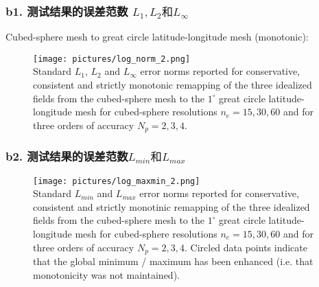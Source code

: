 \documentclass[unknownkeysallowed]{beamer}
\begin{document}
\begin{spacing}{1.2}
\begin{frame}
\frametitle{b1. 测试结果的误差范数 $L_1, L_2 \text{和}L_\infty$}
\scriptsize{Cubed-sphere mesh to great circle latitude-longitude mesh (\textcolor[rgb]{0,0,1}{monotonic}):}
\begin{figure}[c]
\texttt{[image: pictures/log\_norm\_2.png]}\\
\tiny{Standard $L_1$, $L_2$ and $L_{\infty}$ error norms reported for conservative, consistent and strictly monotonic remapping
of the three idealized fields from the cubed-sphere mesh to the $1^\circ$ great circle latitude-longitude
mesh for cubed-sphere resolutions $n_e = 15,30,60$ and for three orders of accuracy $N_p = 2,3,4$.}
\end{figure}
\end{frame}
\begin{frame}
\frametitle{b2. 测试结果的误差范数$L_{min} \text{和} L_{max}$}
\begin{figure}[c]
\texttt{[image: pictures/log\_maxmin\_2.png]}\\
\tiny{Standard $L_{min}$ and $L_{max}$ error norms reported for conservative, consistent and strictly monotinic remapping
of the three idealized fields from the cubed-sphere mesh to the $1^\circ$ great circle latitude-longitude
mesh for cubed-sphere resolutions $n_e = 15,30,60$ and for three orders of accuracy $N_p = 2,3,4$. Circled data points indicate that the global minimum / maximum has been enhanced (i.e. that monotonicity was not maintained).}
\end{figure}
\end{frame}



\end{spacing}
\end{document}
